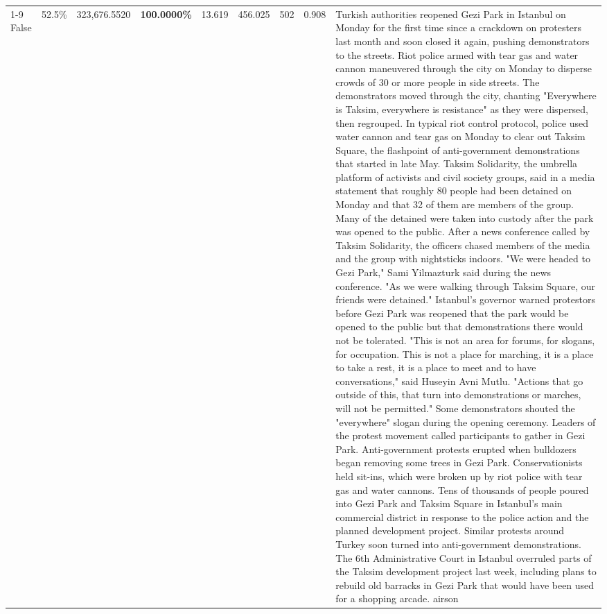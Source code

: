 \begin{table}[H]
\begin{tabular}{lllrlllll}
\cline{1-9}
False & 52.5\% & 323,676.5520 & \bfseries \color{red} 100.0000\% & 13.619 & 456.025 & 502 & 0.908 & Turkish authorities reopened Gezi Park in Istanbul on Monday for the first time since a crackdown on protesters last month and soon closed it again, pushing demonstrators to the streets. Riot police armed with tear gas and water cannon maneuvered through the city on Monday to disperse crowds of 30 or more people in side streets. The demonstrators moved through the city, chanting "Everywhere is Taksim, everywhere is resistance" as they were dispersed, then regrouped. In typical riot control protocol, police used water cannon and tear gas on Monday to clear out Taksim Square, the flashpoint of anti-government demonstrations that started in late May. Taksim Solidarity, the umbrella platform of activists and civil society groups, said in a media statement that roughly 80 people had been detained on Monday and that 32 of them are members of the group. Many of the detained were taken into custody after the park was opened to the public. After a news conference called by Taksim Solidarity, the officers chased members of the media and the group with nightsticks indoors. "We were headed to Gezi Park," Sami Yilmazturk said during the news conference. "As we were walking through Taksim Square, our friends were detained." Istanbul's governor warned protestors before Gezi Park was reopened that the park would be opened to the public but that demonstrations there would not be tolerated. "This is not an area for forums, for slogans, for occupation. This is not a place for marching, it is a place to take a rest, it is a place to meet and to have conversations," said Huseyin Avni Mutlu. "Actions that go outside of this, that turn into demonstrations or marches, will not be permitted." Some demonstrators shouted the "everywhere" slogan during the opening ceremony. Leaders of the protest movement called participants to gather in Gezi Park. Anti-government protests erupted when bulldozers began removing some trees in Gezi Park. Conservationists held sit-ins, which were broken up by riot police with tear gas and water cannons. Tens of thousands of people poured into Gezi Park and Taksim Square in Istanbul's main commercial district in response to the police action and the planned development project. Similar protests around Turkey soon turned into anti-government demonstrations. The 6th Administrative Court in Istanbul overruled parts of the Taksim development project last week, including plans to rebuild old barracks in Gezi Park that would have been used for a shopping arcade. airson \\

\end{tabular}
\end{table}
